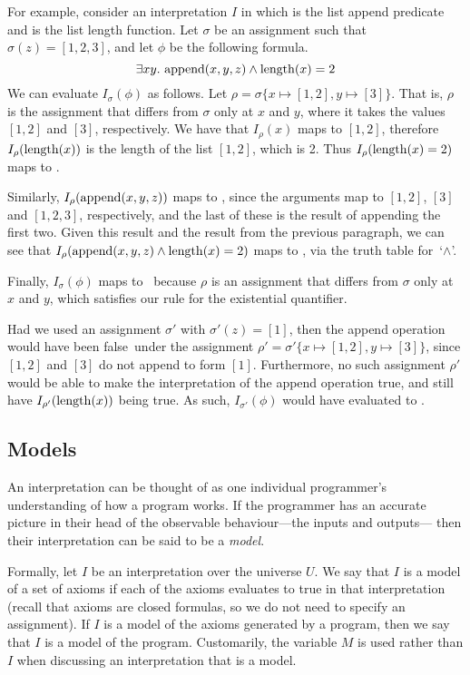 For example,
consider an interpretation $I$ in which
 is the list append predicate
and  is the list length function.
Let $\sigma$ be an assignment such that $\sigma(z) = [1, 2, 3]$,
and let $\phi$ be the following formula.
\[
\exists x y.\, \operatorname{append}(x, y, z) \land \operatorname{length}(x) = 2
\]
We can evaluate $I_\sigma(\phi)$ as follows.
Let $\rho = \sigma \{ x \mapsto [1, 2], y \mapsto [3] \}$.
That is, $\rho$ is the assignment
that differs from $\sigma$ only at $x$ and $y$,
where it takes the values $[1, 2]$ and $[3]$, respectively.
We have that $I_{\rho}(x)$ maps to $[1, 2]$,
therefore $I_{\rho}(\operatorname{length}(x))$
is the length of the list $[1, 2]$, which is 2.
Thus $I_{\rho}(\operatorname{length}(x) = 2)$ maps to \true.

Similarly,
$I_{\rho}(\operatorname{append}(x, y, z))$ maps to \true,
since the arguments map to
$[1, 2]$, $[3]$ and $[1, 2, 3]$, respectively,
and the last of these is the result of
appending the first two.
Given this result and the result from the previous paragraph,
we can see that
$I_{\rho}(\operatorname{append}(x, y, z) \land \operatorname{length}(x) = 2)$
maps to \true,
via the truth table for~`$\land$'.

Finally, $I_\sigma(\phi)$ maps to \true\ because
$\rho$ is an assignment that differs from $\sigma$
only at $x$ and $y$,
which satisfies our rule for the existential quantifier.

Had we used an assignment $\sigma'$ with $\sigma'(z) = [1]$,
then the append operation would have been false\ under
the assignment $\rho' = \sigma' \{ x \mapsto [1,2], y \mapsto [3] \}$,
since $[1, 2]$ and $[3]$ do not append to form $[1]$.
Furthermore,
no such assignment $\rho'$ would be able to make
the interpretation of the append operation true,
and still have $I_{\rho'}(\operatorname{length}(x))$ being true.
As such, $I_{\sigma'}(\phi)$ would have evaluated to \false.


\subsection{Models}
\label{sec:models}

An interpretation can be thought of as
one individual programmer's understanding of
how a program works.
If the programmer has an accurate picture in their head
of the observable behaviour---the inputs and outputs---%
then their interpretation can be said to be a
\emph{model\label{gi:model}}.

Formally,
let $I$ be an interpretation over the universe $U$.
We say that $I$ is a model of a set of axioms
if each of the axioms evaluates to true
in that interpretation
(recall that axioms are closed formulas,
so we do not need to specify an assignment).
If $I$ is a model of the axioms generated by a program,
then we say that $I$ is a model of the program.
Customarily, the variable $M$ is used rather than $I$
when discussing an interpretation that is a model.

